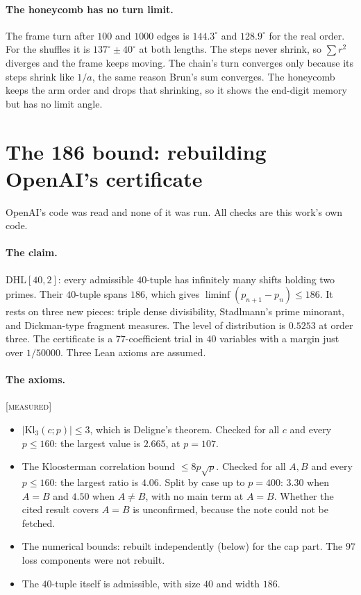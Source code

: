 \documentclass[11pt]{article}
\theoremstyle{definition}
\theoremstyle{remark}
\newcommand{\grade}[1]{\textsc{[#1]}}
\begin{document}
\paragraph{The honeycomb has no turn limit.} The frame turn after $100$ and $1000$ edges is $144.3^\circ$ and $128.9^\circ$ for the real order. For the shuffles it is $137^\circ\pm40^\circ$ at both lengths. The steps never shrink, so $\sum r^2$ diverges and the frame keeps moving. The chain's turn converges only because its steps shrink like $1/a$, the same reason Brun's sum converges. The honeycomb keeps the arm order and drops that shrinking, so it shows the end-digit memory but has no limit angle.

\section{The 186 bound: rebuilding OpenAI's certificate}\label{sec:186}

\noindent OpenAI's code was read and none of it was run. All checks are this work's own code.

\paragraph{The claim.} DHL$[40,2]$: every admissible $40$-tuple has infinitely many shifts holding two primes. Their $40$-tuple spans $186$, which gives $\liminf(p_{n+1}-p_n)\le186$. It rests on three new pieces: triple dense divisibility, Stadlmann's prime minorant, and Dickman-type fragment measures. The level of distribution is $0.5253$ at order three. The certificate is a $77$-coefficient trial in $40$ variables with a margin just over $1/50000$. Three Lean axioms are assumed.

\paragraph{The axioms.} \grade{measured}
\begin{itemize}
\item $|\mathrm{Kl}_3(c;p)|\le3$, which is Deligne's theorem. Checked for all $c$ and every $p\le160$: the largest value is $2.665$, at $p=107$.
\item The Kloosterman correlation bound $\le8p\sqrt p$. Checked for all $A,B$ and every $p\le160$: the largest ratio is $4.06$. Split by case up to $p=400$: $3.30$ when $A=B$ and $4.50$ when $A\neq B$, with no main term at $A=B$. Whether the cited result covers $A=B$ is unconfirmed, because the note could not be fetched.
\item The numerical bounds: rebuilt independently (below) for the cap part. The $97$ loss components were not rebuilt.
\item The $40$-tuple itself is admissible, with size $40$ and width $186$.
\end{itemize}
\end{document}
